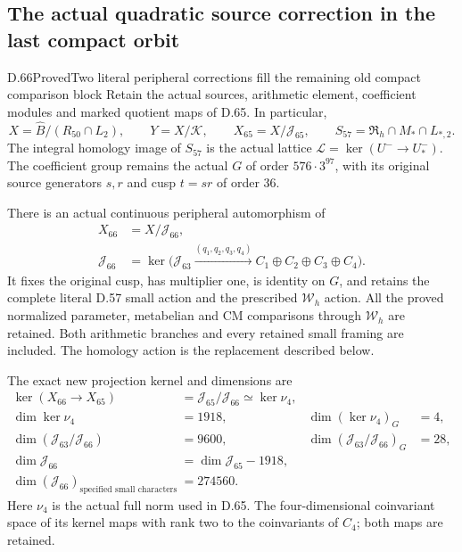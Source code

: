 \subsection{The actual quadratic source correction in the last compact orbit}

\begin{statement}{D.66}{Proved}{Two literal peripheral corrections fill the remaining old compact comparison block}
Retain the actual sources, arithmetic element, coefficient modules and
marked quotient maps of D.65. In particular,
\[
 X=\widehat B/(R_{50}\cap L_2),\qquad
 Y=X/\mathcal K,\qquad X_{65}=X/\mathcal J_{65},\qquad
 S_{57}=\mathfrak R_h\cap M_*\cap L_{*,2}.
 \tag{D.66.1}
\]
The integral homology image of \(S_{57}\) is the actual lattice
\(\mathcal L=\ker(U^-\to U_*^-)\). The coefficient group remains
the actual \(G\) of order \(576\cdot3^{97}\), with its original
source generators \(s,r\) and cusp \(t=sr\) of order 36.

There is an actual continuous peripheral automorphism of
\[
 \begin{aligned}
 X_{66}&=X/\mathcal J_{66},\\
 \mathcal J_{66}
  &=\ker\bigl(\mathcal J_{63}
        \xrightarrow{(q_1,q_2,q_3,q_4)}
                         C_1\oplus C_2\oplus C_3\oplus C_4\bigr).
 \end{aligned}
 \tag{D.66.2}
\]
It fixes the original cusp, has multiplier one, is identity on \(G\),
and retains the complete literal D.57 small action and the prescribed
\(\mathcal W_h\) action. All the proved normalized parameter,
metabelian and CM comparisons through \(\mathcal W_h\) are retained.
Both arithmetic branches and every retained small framing are included.
The homology action is the replacement described below.

The exact new projection kernel and dimensions are
\[
 \begin{aligned}
 \ker(X_{66}\to X_{65})
     &=\mathcal J_{65}/\mathcal J_{66}\simeq\ker\nu_4,\\
 \dim\ker\nu_4&=1918,
       &\dim(\ker\nu_4)_G&=4,\\
 \dim(\mathcal J_{63}/\mathcal J_{66})&=9600,
       &\dim(\mathcal J_{63}/\mathcal J_{66})_G&=28,\\
 \dim\mathcal J_{66}&=\dim\mathcal J_{65}-1918,\\
 \dim(\mathcal J_{66})_{\text{specified small characters}}&=274560.
 \end{aligned}
 \tag{D.66.3}
\]
Here \(\nu_4\) is the actual full norm used in D.65. The
four-dimensional coinvariant space of its kernel maps with rank two
to the coinvariants of \(C_4\); both maps are retained.


\end{statement}
